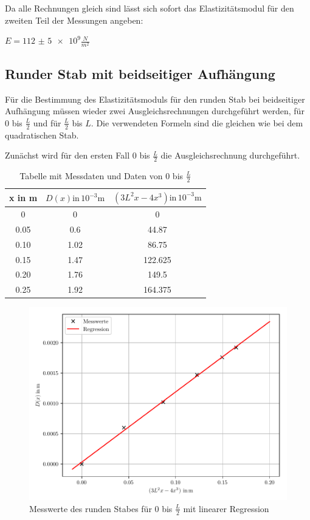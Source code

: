 Da alle Rechnungen gleich sind lässt sich sofort das Elastizitätsmodul für den
zweiten Teil der Messungen angeben:\\

\centerline{$E = \num{112(5)e9} \frac{N}{m^2}$}


\subsection{Runder Stab mit beidseitiger Aufhängung}

Für die Bestimmung des Elastizitätsmoduls für den runden Stab bei beidseitiger
Aufhängung müssen wieder zwei Ausgleichsrechnungen durchgeführt werden, für
$0$ bis $\frac{L}{2}$ und für $\frac{L}{2}$ bis $L$. Die verwendeten Formeln sind
die gleichen wie bei dem quadratischen Stab.

Zunächst wird für den ersten Fall $0$ bis $\frac{L}{2}$ die Ausgleichsrechnung
durchgeführt.

\begin{table}
  \centering
  \caption{Tabelle mit Messdaten und Daten von $0$ bis $\frac{L}{2}$}
  \begin{tabular}{c c c}
    \toprule
    x in \si{\meter} & $D(x) \text{in} \, 10^{-3} \si{\meter}$ &
    $ \left( 3L^2x-4x^3 \right) \text{in} \, 10^{-3} \si{\meter}$\\
    \midrule
    0    & 0    &  0 \\
    0.05 & 0.6 & 44.87 \\
    0.10 & 1.02 &  86.75 \\
    0.15 & 1.47 &  122.625 \\
    0.20 & 1.76 &  149.5 \\
    0.25 & 1.92 &  164.375 \\
    \bottomrule
  \end{tabular}
\end{table}

\begin{figure}[H]
  \centering
  \includegraphics[width=\textwidth]{ausgleichsgerade4.pdf}
  \caption{Messwerte des runden Stabes für $0$ bis $\frac{L}{2}$ mit linearer Regression}
\end{figure}

